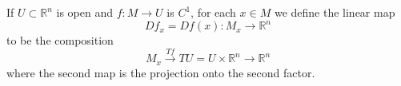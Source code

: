 If $U \subset \mathbb{R}^n$ is open and $f: M \to U$ is $C^1$, for each $x \in M$ we define the linear map
$$Df_x = Df(x): M_x \to \mathbb{R}^n$$
to be the composition
$$M_x \xrightarrow{Tf} TU = U \times \mathbb{R}^n \to \mathbb{R}^n$$
where the second map is the projection onto the second factor.

